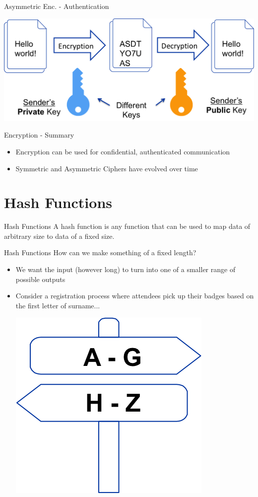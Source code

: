 \documentclass[aspectratio=169]{beamer}
\begin{document}
\begin{frame}{{\color{red}Asymmetric Enc. - Authentication}}
\begin{center}
\includegraphics[width=0.9\linewidth]{asymmetric-authentication.png}
\end{center}
\end{frame}

\begin{frame}{Encryption - Summary}
\begin{itemize}
\item Encryption can be used for confidential, authenticated communication 
\item Symmetric and Asymmetric Ciphers have evolved over time
\end{itemize}
\end{frame}

\section{Hash Functions}
\frame{\sectionpage}

\begin{frame}{Hash Functions}
A hash function is any function that can be used to map data of arbitrary size to data of a fixed size.
\end{frame}

\begin{frame}{Hash Functions}
How can we make something of a fixed length? 
\begin{itemize}
\item We want the input (however long) to turn into one of a smaller range of possible outputs
\item Consider a registration process where attendees pick up their badges based on the first letter of surname... 
\begin{center}
\includegraphics[width=0.3\linewidth]{surname-sort.png}
\end{center}
\end{itemize}
\end{frame}
\end{document}
